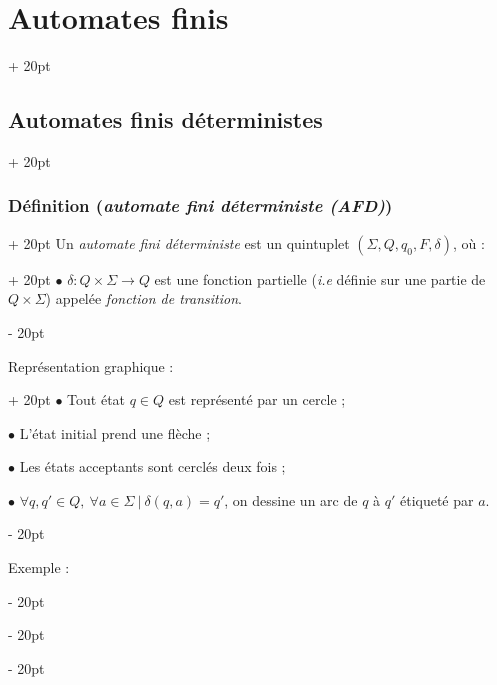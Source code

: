 \documentclass[a4paper, 12pt, twoside]{article}
\newcommand{\ind}[1][20pt]{\advance\leftskip + #1}
\newcommand{\deind}[1][20pt]{\advance\leftskip - #1}
\newenvironment{indt}[2][20pt]{#2 \par \ind[#1]}{\par \deind} %
\begin{document}
\begin{indt}{\section{Automates finis}}
\begin{indt}{\subsection{Automates finis déterministes}}
\begin{indt}{\subsubsection{Définition (\textit{automate fini déterministe (AFD)})}}
\begin{indt}{Un \emph{automate fini déterministe} est un quintuplet $(\Sigma, Q, q_0, F, \delta)$, où :}
                    $\bullet$ $\delta : Q \times \Sigma \longrightarrow Q$ est une fonction partielle (\textit{i.e} définie sur une partie de $Q \times \Sigma$) appelée \emph{fonction de transition}.
                \end{indt}

                \vspace{12pt}
                
                \begin{indt}{Représentation graphique :}
                    $\bullet$ Tout état $q \in Q$ est représenté par un cercle ;

                    $\bullet$ L'état initial prend une flèche ;

                    $\bullet$ Les états acceptants sont cerclés deux fois ;

                    $\bullet$ $\forall q, q' \in Q,\ \forall a \in \Sigma\ |\ \delta(q, a) = q'$, on dessine un arc de $q$ à $q'$ étiqueté par $a$.
                \end{indt}

                \vspace{12pt}
                
                Exemple :
                \begin{center}
                \end{center}


\end{indt}
\end{indt}
\end{indt}
\end{document}
